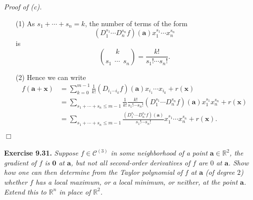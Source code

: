 \documentclass{article}
\begin{document}
\emph{Proof of (c).}
\begin{enumerate}
\item[(1)]
  As $s_1 + \cdots + s_n = k$,
  the number of terms of the form
  \[
    (D_1^{s_1} \cdots D_n^{s_n}f)(\mathbf{a}) x_1^{s_1} \cdots x_n^{s_n}
  \]
  is
  \[
    {k \choose s_1 \:\: \cdots \:\: s_n}
    = \frac{k!}{s_1! \cdots s_n!}.
  \]

\item[(2)]
  Hence we can write
  \begin{align*}
    f(\mathbf{a} + \mathbf{x})
    &= \sum_{k=0}^{m-1} \frac{1}{k!}(D_{i_1 \cdots i_k}f)(\mathbf{a})x_{i_1} \cdots x_{i_k}
      + r(\mathbf{x}) \\
    &= \sum_{s_1+\cdots+s_n \leq m-1}
      \frac{1}{k!} \frac{k!}{s_1! \cdots s_n!}
      (D_1^{s_1} \cdots D_n^{s_n}f)(\mathbf{a}) x_1^{s_1} x_n^{s_n} + r(\mathbf{x}) \\
    &= \sum_{s_1+\cdots+s_n \leq m-1}
      \frac{(D_1^{s_1} \cdots D_n^{s_n}f)(\mathbf{a})}{s_1! \cdots s_n!}
        x_1^{s_1} \cdots x_n^{s_n} + r(\mathbf{x}).
  \end{align*}

\end{enumerate}
$\Box$ \\\\






\textbf{Exercise 9.31.}
\emph{Suppose $f \in \mathscr{C}^{(3)}$ in some neighborhood of a point
$\mathbf{a} \in \mathbb{R}^2$,
the gradient of $f$ is $\mathbf{0}$ at $\mathbf{a}$,
but not all second-order derivatives of $f$ are $0$ at $\mathbf{a}$.
Show how one can then determine from the Taylor polynomial of $f$ at $\mathbf{a}$
(of degree $2$) whether $f$ has a local maximum,
or a local minimum, or neither, at the point $\mathbf{a}$.
Extend this to $\mathbb{R}^n$ in place of $\mathbb{R}^2$.} \\
\end{document}
